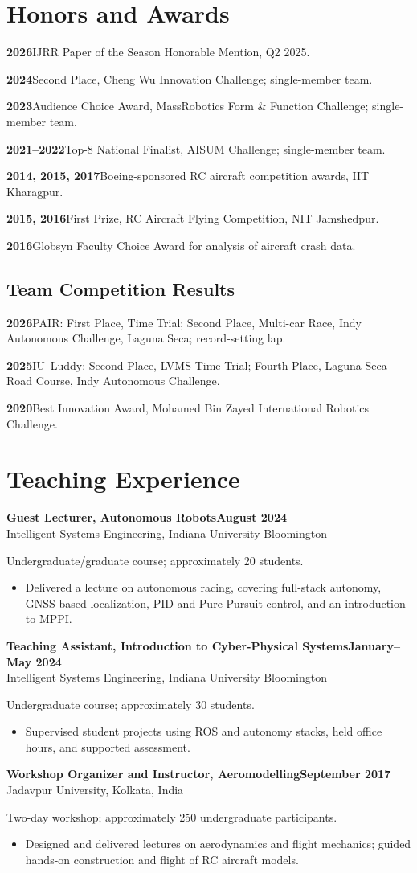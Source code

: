 \documentclass[11pt,letterpaper]{article}
\newcommand{\entry}[3]{\Needspace{4\baselineskip}\textbf{#1}\hfill\textbf{#2}\\#3\par}
\newcommand{\award}[2]{\textbf{#1}\quad #2\par}
\begin{document}
\section{Honors and Awards}
\award{2026}{IJRR Paper of the Season Honorable Mention, Q2 2025.}
\award{2024}{Second Place, Cheng Wu Innovation Challenge; single-member team.}
\award{2023}{Audience Choice Award, MassRobotics Form \& Function Challenge; single-member team.}
\award{2021--2022}{Top-8 National Finalist, AISUM Challenge; single-member team.}
\award{2014, 2015, 2017}{Boeing-sponsored RC aircraft competition awards, IIT Kharagpur.}
\award{2015, 2016}{First Prize, RC Aircraft Flying Competition, NIT Jamshedpur.}
\award{2016}{Globsyn Faculty Choice Award for analysis of aircraft crash data.}
\subsection{Team Competition Results}
\award{2026}{PAIR: First Place, Time Trial; Second Place, Multi-car Race, Indy Autonomous Challenge, Laguna Seca; record-setting lap.}
\award{2025}{IU--Luddy: Second Place, LVMS Time Trial; Fourth Place, Laguna Seca Road Course, Indy Autonomous Challenge.}
\award{2020}{Best Innovation Award, Mohamed Bin Zayed International Robotics Challenge.}

\newpage
\section{Teaching Experience}
\entry{Guest Lecturer, Autonomous Robots}{August 2024}{Intelligent Systems Engineering, Indiana University Bloomington}
Undergraduate/graduate course; approximately 20 students.
\begin{itemize}
\item Delivered a lecture on autonomous racing, covering full-stack autonomy, GNSS-based localization, PID and Pure Pursuit control, and an introduction to MPPI.
\end{itemize}
\entry{Teaching Assistant, Introduction to Cyber-Physical Systems}{January--May 2024}{Intelligent Systems Engineering, Indiana University Bloomington}
Undergraduate course; approximately 30 students.
\begin{itemize}
\item Supervised student projects using ROS and autonomy stacks, held office hours, and supported assessment.
\end{itemize}
\entry{Workshop Organizer and Instructor, Aeromodelling}{September 2017}{Jadavpur University, Kolkata, India}
Two-day workshop; approximately 250 undergraduate participants.
\begin{itemize}
\item Designed and delivered lectures on aerodynamics and flight mechanics; guided hands-on construction and flight of RC aircraft models.
\end{itemize}
\end{document}
